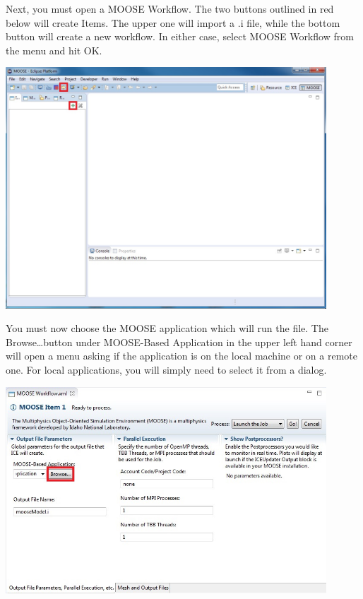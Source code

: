 Next, you must open a MOOSE Workflow. The two buttons outlined in red below will
create Items. The upper one will import a .i file, while the bottom button will
create a new workflow. In either case, select MOOSE Workflow from the menu and
hit OK.

\begin{center}
\includegraphics[width=12cm]{images/MOOSEPerspectiveNewWorkflow}
\end{center}

You must now choose the MOOSE application which will run the file. The
Browse\ldots button under MOOSE-Based Application in the upper left hand corner
will open a menu asking if the application is on the local machine or on a
remote one. For local applications, you will simply need to select it from a
dialog. 

\begin{center}
\includegraphics[width=12cm]{images/MOOSEItem}
\end{center}

